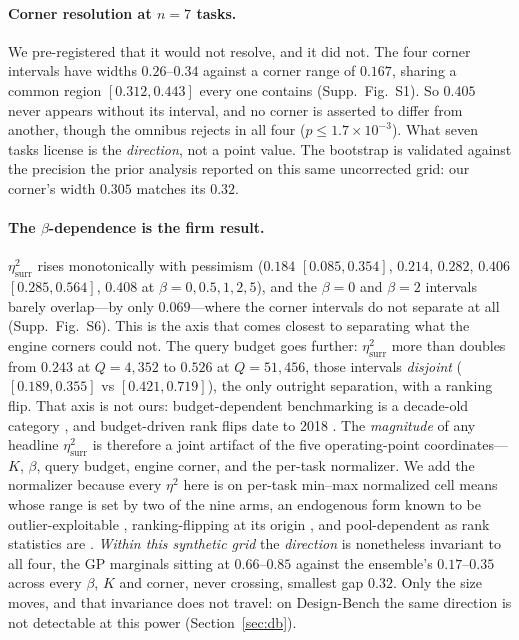 \documentclass[letterpaper]{article} %
\theoremstyle{plain}
\newcommand{\mdemph}[1]{\emph{#1}}
\begin{document}
\paragraph{Corner resolution at $n{=}7$ tasks.} We pre-registered that it would not resolve, and it did not. The four corner intervals have widths $0.26$--$0.34$ against a corner range of $0.167$, sharing a common region $[0.312,0.443]$ every one contains (Supp.\ Fig.\ S1). So $0.405$ never appears without its interval, and no corner is asserted to differ from another, though the omnibus rejects in all four ($p\le1.7\times10^{-3}$). What seven tasks license is the \mdemph{direction}, not a point value. The bootstrap is validated against the precision the prior analysis reported on this same uncorrected grid: our corner's width $0.305$ matches its $0.32$.

\paragraph{The $\beta$-dependence is the firm result.} $\eta^2_{\text{surr}}$ rises monotonically with pessimism ($0.184$ $[0.085,0.354]$, $0.214$, $0.282$, $0.406$ $[0.285,0.564]$, $0.408$ at $\beta = 0,0.5,1,2,5$), and the $\beta{=}0$ and $\beta{=}2$ intervals barely overlap---by only $0.069$---where the corner intervals do not separate at all (Supp.\ Fig.\ S6). This is the axis that comes closest to separating what the engine corners could not. The query budget goes further: $\eta^2_{\text{surr}}$ more than doubles from $0.243$ at $Q{=}4{,}352$ to $0.526$ at $Q{=}51{,}456$, those intervals \mdemph{disjoint} ($[0.189,0.355]$ vs $[0.421,0.719]$), the only outright separation, with a ranking flip. That axis is not ours: budget-dependent benchmarking is a decade-old category \citep{hansen2021coco}, and budget-driven rank flips date to 2018 \citep{lucic2018gansequal}. The \mdemph{magnitude} of any headline $\eta^2_{\text{surr}}$ is therefore a joint artifact of the five operating-point coordinates---$K$, $\beta$, query budget, engine corner, and the per-task normalizer. We add the normalizer because every $\eta^2$ here is on per-task min--max normalized cell means whose range is set by two of the nine arms, an endogenous form known to be outlier-exploitable \citep{jordan2024position}, ranking-flipping at its origin \citep{bellemare2013ale}, and pool-dependent as rank statistics are \citep{balduzzi2018reevaluating}. \mdemph{Within this synthetic grid} the \mdemph{direction} is nonetheless invariant to all four, the GP marginals sitting at $0.66$--$0.85$ against the ensemble's $0.17$--$0.35$ across every $\beta$, $K$ and corner, never crossing, smallest gap $0.32$. Only the size moves, and that invariance does not travel: on Design-Bench the same direction is not detectable at this power (Section~\ref{sec:db}).
\end{document}

